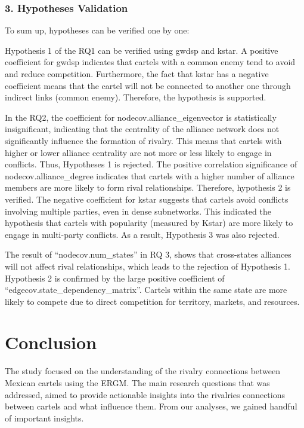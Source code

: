 \documentclass[
]{article}
\begin{document}
\subsubsection{3. Hypotheses Validation}\label{hypotheses-validation}

To sum up, hypotheses can be verified one by one:

Hypothesis 1 of the RQ1 can be verified using gwdsp and kstar. A
positive coefficient for gwdsp indicates that cartels with a common
enemy tend to avoid and reduce competition. Furthermore, the fact that
kstar has a negative coefficient means that the cartel will not be
connected to another one through indirect links (common enemy).
Therefore, the hypothesis is supported.

In the RQ2, the coefficient for nodecov.alliance\_eigenvector is
statistically insignificant, indicating that the centrality of the
alliance network does not significantly influence the formation of
rivalry. This means that cartels with higher or lower alliance
centrality are not more or less likely to engage in conflicts. Thus,
Hypotheses 1 is rejected. The positive correlation significance of
nodecov.alliance\_degree indicates that cartels with a higher number of
alliance members are more likely to form rival relationships. Therefore,
hypothesis 2 is verified. The negative coefficient for kstar suggests
that cartels avoid conflicts involving multiple parties, even in dense
subnetworks. This indicated the hypothesis that cartels with popularity
(measured by Kstar) are more likely to engage in multi-party conflicts.
As a result, Hypothesis 3 was also rejected.

The result of ``nodecov.num\_states'' in RQ 3, shows that cross-states
alliances will not affect rival relationships, which leads to the
rejection of Hypothesis 1. Hypothesis 2 is confirmed by the large
positive coefficient of ``edgecov.state\_dependency\_matrix''. Cartels
within the same state are more likely to compete due to direct
competition for territory, markets, and resources.

\section{Conclusion}\label{conclusion}

The study focused on the understanding of the rivalry connections
between Mexican cartels using the ERGM. The main research questions that
was addressed, aimed to provide actionable insights into the rivalries
connections between cartels and what influence them. From our analyses,
we gained handful of important insights.
\end{document}
